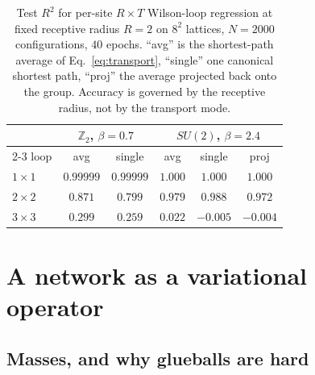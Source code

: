 \documentclass[aps,prl,reprint,superscriptaddress,nofootinbib]{revtex4-2}
\newcommand{\Zt}{\mathbb{Z}_2}
\begin{document}
\begin{table}[t]
\caption{Test $R^2$ for per-site $R\times T$ Wilson-loop regression at fixed
receptive radius $R=2$ on $8^2$ lattices, $N=2000$ configurations, $40$ epochs.
``avg'' is the shortest-path average of Eq.~\eqref{eq:transport}, ``single'' one
canonical shortest path, ``proj'' the average projected back onto the group.
Accuracy is governed by the receptive radius, not by the transport mode.}
\label{tab:transport}
\begin{ruledtabular}
\begin{tabular}{lccccc}
 & \multicolumn{2}{c}{$\Zt$, $\beta=0.7$} & \multicolumn{3}{c}{$SU(2)$, $\beta=2.4$}\\
\cline{2-3}\cline{4-6}
loop & avg & single & avg & single & proj \\
\colrule
$1\times1$ & $0.99999$ & $0.99999$ & $1.000$ & $1.000$ & $1.000$ \\
$2\times2$ & $0.871$ & $0.799$ & $0.979$ & $0.988$ & $0.972$ \\
$3\times3$ & $0.299$ & $0.259$ & $0.022$ & $-0.005$ & $-0.004$ \\
\end{tabular}
\end{ruledtabular}
\end{table}

\section{A network as a variational operator}
\label{sec:spectroscopy}

\subsection{Masses, and why glueballs are hard}
\end{document}
